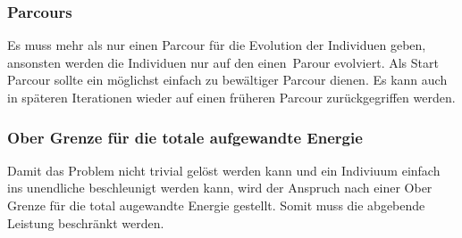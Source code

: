     \subsubsection{Parcours}
      Es muss mehr als nur einen Parcour für die Evolution der Individuen geben,
      ansonsten werden die Individuen nur auf den einen Parour evolviert.
      Als Start Parcour sollte ein möglichst einfach zu bewältiger Parcour dienen.
      Es kann auch in späteren Iterationen wieder auf einen früheren Parcour zurückgegriffen werden.
    \subsubsection{Ober Grenze für die totale aufgewandte Energie}
      Damit das Problem nicht trivial gelöst werden kann und ein Indiviuum einfach ins unendliche beschleunigt werden kann,
      wird der Anspruch nach einer Ober Grenze für die total augewandte Energie gestellt. Somit muss die abgebende Leistung beschränkt werden.
